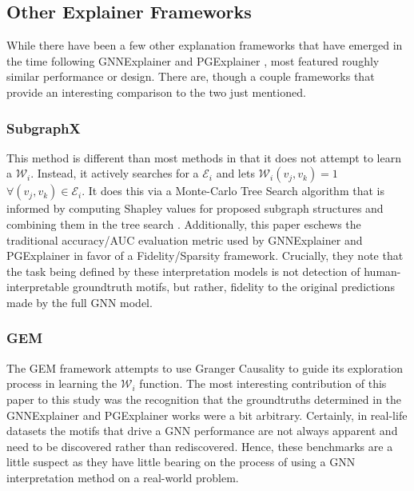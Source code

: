 \subsection{Other Explainer Frameworks}
While there have been a few other explanation frameworks that have emerged in the time following GNNExplainer \cite{ying_gnnexplainer_2019} and PGExplainer \cite{luo_parameterized_2020}, most featured roughly similar performance or design. There are, though a couple frameworks that provide an interesting comparison to the two just mentioned.
\subsubsection{SubgraphX}
This method is different than most methods in that it does not attempt to learn a $\mathcal{W}_i$. Instead, it actively searches for a $\mathcal{E}_i$ and lets $\mathcal{W}_i(v_j, v_k) = 1$ $\forall (v_j, v_k) \in \mathcal{E}_i$. It does this via a Monte-Carlo Tree Search algorithm that is informed by computing Shapley values for proposed subgraph structures and combining them in the tree search \cite{yuan_explainability_2021}. Additionally, this paper eschews the traditional accuracy/AUC evaluation metric used by GNNExplainer and PGExplainer in favor of a Fidelity/Sparsity framework. Crucially, they note that the task being defined by these interpretation models is not detection of human-interpretable groundtruth motifs, but rather, fidelity to the original predictions made by the full GNN model.
\subsubsection{GEM}
The GEM framework attempts to use Granger Causality to guide its exploration process in learning the $\mathcal{W}_i$ function. The most interesting contribution of this paper to this study was the recognition that the groundtruths determined in the GNNExplainer and PGExplainer works were a bit arbitrary. Certainly, in real-life datasets the motifs that drive a GNN performance are not always apparent and need to be discovered rather than rediscovered. Hence, these benchmarks are a little suspect as they have little bearing on the process of using a GNN interpretation method on a real-world problem.

